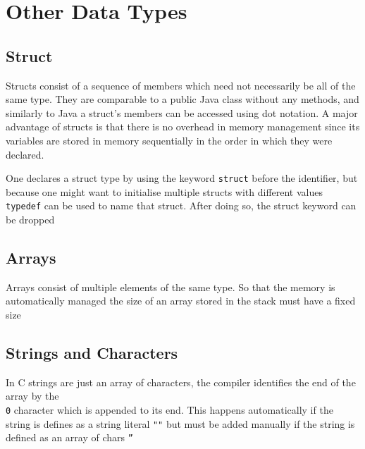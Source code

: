 \section{Other Data Types}

\subsection{Struct}

\par{Structs consist of a sequence of members which need not necessarily be all of the same
type. They are comparable to a public Java class without any methods, and similarly to Java a
struct's members can be accessed using dot notation. A major advantage of structs is that there is
no overhead in memory management since its variables are stored in memory sequentially in the order
in which they were declared.}
\par{One declares a struct type by using the keyword \texttt{struct} before the identifier, but
because one might want to initialise multiple structs with different values \texttt{typedef} can be
used to name that struct. After doing so, the struct keyword can be dropped}

\subsection{Arrays}
\par{Arrays consist of multiple elements of the same type. So that the memory is automatically
managed the size of an array stored in the stack  must have a fixed size }



\subsection{Strings and Characters}

\par{In C strings are just an array of characters, the compiler identifies the end of the array
by the \texttt{\\0} character which is appended to its end. This happens automatically if the string
is defines as a string literal \texttt{""} but must be added manually if the string is defined as an
array of chars \texttt{''}}

